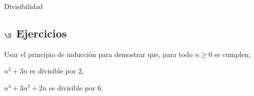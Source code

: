 \begin{section}{Divisibilidad}
\subsection*{$\S$ Ejercicios}
\begin{enumex}
    \item Usar el principio de inducción para demostrar que, para todo $n\ge0$ 
    se cumplen;
    \begin{enumex}
        \item $n^2+3n$ es divisible por $2$,
        
        \item $n^3+3n^2+2n$ es divisible por $6$. 
    \end{enumex}
\end{enumex}

\end{section}


